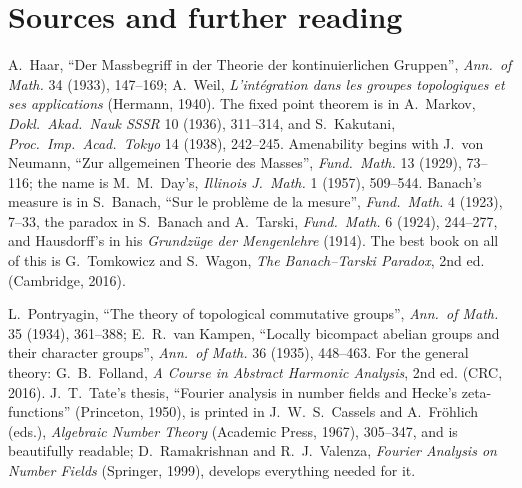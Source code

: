 \section*{Sources and further reading}

A.~Haar, ``Der Massbegriff in der Theorie der kontinuierlichen Gruppen'', \emph{Ann.\ of Math.} 34 (1933), 147--169; A.~Weil, \emph{L'int\'egration dans les groupes topologiques
et ses applications} (Hermann, 1940). The fixed point theorem is in A.~Markov, \emph{Dokl.\ Akad.\ Nauk SSSR} 10 (1936), 311--314, and S.~Kakutani, \emph{Proc.\ Imp.\ Acad.\ Tokyo} 14
(1938), 242--245. Amenability begins with J.~von Neumann, ``Zur allgemeinen Theorie des Masses'', \emph{Fund.\ Math.} 13 (1929), 73--116; the name is M.~M.~Day's, \emph{Illinois J.\
Math.} 1 (1957), 509--544. Banach's measure is in S.~Banach, ``Sur le probl\`eme de la mesure'', \emph{Fund.\ Math.} 4 (1923), 7--33, the paradox in S.~Banach and A.~Tarski, \emph{Fund.\
Math.} 6 (1924), 244--277, and Hausdorff's in his \emph{Grundz\"uge der Mengenlehre} (1914). The best book on all of this is G.~Tomkowicz and S.~Wagon, \emph{The Banach--Tarski
Paradox}, 2nd ed. (Cambridge, 2016).

L.~Pontryagin, ``The theory of topological commutative groups'', \emph{Ann.\ of Math.} 35 (1934), 361--388; E.~R.~van Kampen, ``Locally bicompact abelian groups and their character
groups'', \emph{Ann.\ of Math.} 36 (1935), 448--463. For the general theory: G.~B.~Folland, \emph{A Course in Abstract Harmonic Analysis}, 2nd ed. (CRC, 2016). J.~T.~Tate's thesis,
``Fourier analysis in number fields and Hecke's zeta-functions'' (Princeton, 1950), is printed in J.~W.~S.~Cassels and A.~Fr\"ohlich (eds.), \emph{Algebraic Number Theory}
(Academic Press, 1967), 305--347, and is beautifully readable; D.~Ramakrishnan and R.~J.~Valenza, \emph{Fourier Analysis on Number Fields} (Springer, 1999), develops everything
needed for it.
